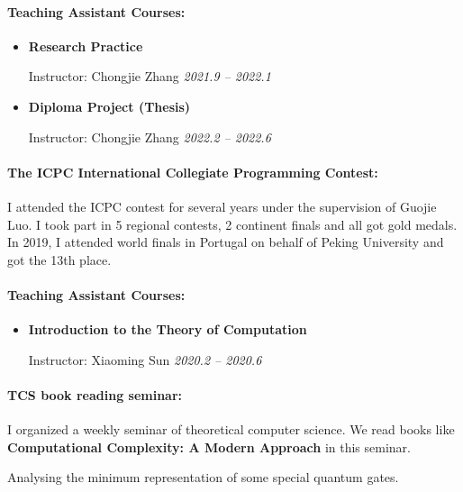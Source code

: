 \documentclass{resume}
\begin{document}
\paragraph{Teaching Assistant Courses:}
\begin{itemize}
  \item \textbf{Research Practice} 
  
  Instructor: Chongjie Zhang \hfill \textit{2021.9 -- 2022.1}
  \item \textbf{Diploma Project (Thesis)}

  Instructor: Chongjie Zhang \hfill \textit{2022.2 -- 2022.6}
\end{itemize}

\vspace{2em}


\paragraph{The ICPC International Collegiate Programming Contest:}
I attended the ICPC contest for several years under the supervision of Guojie Luo. I took part in 5 regional contests, 2 continent finals and all got gold medals. In 2019, I attended world finals in Portugal on behalf of Peking University and got the 13th place.

\paragraph{Teaching Assistant Courses:}
\begin{itemize}
  \item \textbf{Introduction to the Theory of Computation} 
  
  Instructor: Xiaoming Sun \hfill \textit{2020.2 -- 2020.6}
\end{itemize}

\paragraph{TCS book reading seminar:}
I organized a weekly seminar of theoretical computer science. We read books like \textbf{Computational Complexity: A Modern Approach} in this seminar.

\vspace{2em}

Analysing the minimum representation of some special quantum gates.
\end{document}
